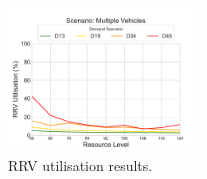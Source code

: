 \documentclass[preprint,12pt]{elsarticle}
\begin{document}
\begin{figure}
\begin{center}
\includegraphics[width=0.45\textwidth]{img/results/multiple_RRVUtilisation}
\end{center}
\caption{RRV utilisation results.}
\label{fig:results_rrv_utilisation_multiple}
\end{figure}
\end{document}
